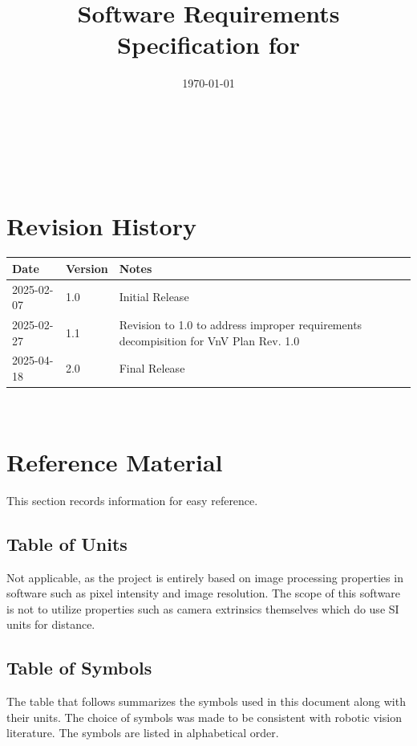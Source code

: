 \documentclass[12pt]{article}
\begin{document}
\title{Software Requirements Specification for \progname} 
\author{\authname}
\date{\today}
	
\maketitle

~\newpage


\tableofcontents

~\newpage

\section*{Revision History}

\begin{tabularx}{\textwidth}{p{3cm}p{2cm}X}
\toprule {\bf Date} & {\bf Version} & {\bf Notes}\\
\midrule
2025-02-07 & 1.0 & Initial Release\\
2025-02-27 & 1.1 & Revision to 1.0 to address improper requirements decompisition for VnV Plan Rev. 1.0\\
2025-04-18 & 2.0 & Final Release\\
\bottomrule
\end{tabularx}
~\newpage

\section{Reference Material}

This section records information for easy reference.

\subsection{Table of Units}
Not applicable, as the project is entirely based on image processing 
properties in software such as pixel intensity and image resolution. 
The scope of this software is not to utilize properties such as camera 
extrinsics themselves which do use SI units for distance.

\subsection{Table of Symbols}

The table that follows summarizes the symbols used in this document along with
their units.  The choice of symbols was made to be consistent with robotic vision literature. 
The symbols are listed in alphabetical order.
\end{document}
